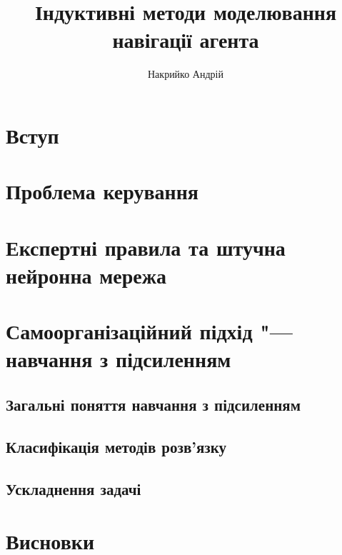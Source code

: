 \documentclass[a4paper,10pt]{article}
\title{Індуктивні методи моделювання навігації агента}
\author{Накрийко Андрій}
\begin{document}
\maketitle

\begin{abstract}

\end{abstract}

\section{Вступ}
\section{Проблема керування}
\section{Експертні правила та штучна нейронна мережа}
\section{Самоорганізаційний підхід "--- навчання з підсиленням}
\subsection{Загальні поняття навчання з підсиленням}
\subsection{Класифікація методів розв'язку}
\subsection{Ускладнення задачі}
\section{Висновки}
\end{document}
